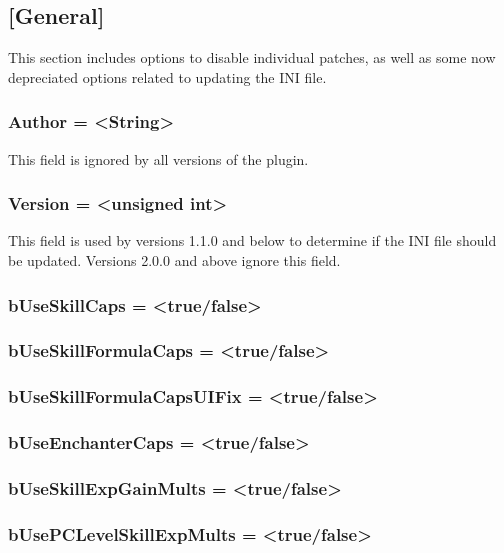\documentclass[12pt]{amsart}
\begin{document}
\startblock
\subsection{[General]}

This section includes options to disable individual patches, as well as some
now depreciated options related to updating the INI file.
\stopblock

\startblock
\subsubsection{Author = <String>}

This field is ignored by all versions of the plugin.
\stopblock

\startblock
\subsubsection{Version = <unsigned int>}

This field is used by versions 1.1.0 and below to determine if the INI file
should be updated. Versions 2.0.0 and above ignore this field.
\stopblock

\subsubsection{bUseSkillCaps = <true/false>}

\subsubsection{bUseSkillFormulaCaps = <true/false>}

\subsubsection{bUseSkillFormulaCapsUIFix = <true/false>}

\subsubsection{bUseEnchanterCaps = <true/false>}

\subsubsection{bUseSkillExpGainMults = <true/false>}

\subsubsection{bUsePCLevelSkillExpMults = <true/false>}
\end{document}
